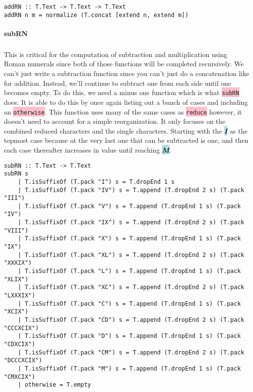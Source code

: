 \documentclass{article}
\begin{document}
\begin{lstlisting}
addRN :: T.Text -> T.Text -> T.Text
addRN n m = normalize (T.concat [extend n, extend m])
\end{lstlisting}

\paragraph{subRN}

\subparagraph{}

This is critical for the computation of subtraction and multiplication using Roman numerals since both of those functions will be completed recursively. We can’t just write a subtraction function since you can’t just do a concatenation like for addition. Instead, we’ll continue to subtract one from each side until one becomes empty. To do this, we need a minus one function which is what \colorbox{pink}{\lstinline{subRN}} does. It is able to do this by once again listing out a bunch of cases and including an \colorbox{pink}{\lstinline{otherwise}}. This function uses many of the same cases as \colorbox{pink}{\lstinline{reduce}} however, it doesn’t need to account for a simple reorganization. It only focuses on the combined reduced characters and the single characters. Starting with the \colorbox{powderblue}{\textbf{\textit{I}}} as the topmost case because at the very last one that can be subtracted is one, and then each case thereafter increases in value until reaching \colorbox{powderblue}{\textbf{\textit{M}}}. 

\begin{lstlisting}
subRN :: T.Text -> T.Text
subRN s
    | T.isSuffixOf (T.pack "I") s = T.dropEnd 1 s
    | T.isSuffixOf (T.pack "IV") s = T.append (T.dropEnd 2 s) (T.pack "III")
    | T.isSuffixOf (T.pack "V") s = T.append (T.dropEnd 1 s) (T.pack "IV")
    | T.isSuffixOf (T.pack "IX") s = T.append (T.dropEnd 2 s) (T.pack "VIII")
    | T.isSuffixOf (T.pack "X") s = T.append (T.dropEnd 1 s) (T.pack "IX")
    | T.isSuffixOf (T.pack "XL") s = T.append (T.dropEnd 2 s) (T.pack "XXXIX")
    | T.isSuffixOf (T.pack "L") s = T.append (T.dropEnd 1 s) (T.pack "XLIX")
    | T.isSuffixOf (T.pack "XC") s = T.append (T.dropEnd 2 s) (T.pack "LXXXIX")
    | T.isSuffixOf (T.pack "C") s = T.append (T.dropEnd 1 s) (T.pack "XCIX")
    | T.isSuffixOf (T.pack "CD") s = T.append (T.dropEnd 2 s) (T.pack "CCCXCIX")
    | T.isSuffixOf (T.pack "D") s = T.append (T.dropEnd 1 s) (T.pack "CDXCIX")
    | T.isSuffixOf (T.pack "CM") s = T.append (T.dropEnd 2 s) (T.pack "DCCCXCIX")
    | T.isSuffixOf (T.pack "M") s = T.append (T.dropEnd 1 s) (T.pack "CMXCIX")
    | otherwise = T.empty
\end{lstlisting}
\end{document}
